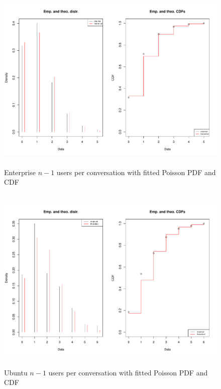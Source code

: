 \begin{figure}
\begin{center}
\caption{Enterprise  $n-1$ users per conversation with fitted Poisson PDF and CDF}
\label{fig:chapt6fig15}
\includegraphics[height=9cm, width=13cm]{graphs/different/15_users_enterprise.pdf} 
\end{center}
\end{figure}

\begin{figure}
\begin{center}
\caption{Ubuntu  $n-1$ users per conversation with fitted Poisson PDF and CDF}
\label{fig:chapt6fig16}
\includegraphics[height=9cm, width=13cm]{graphs/different/16_users_ubuntu.pdf} 
\end{center}
\end{figure}

